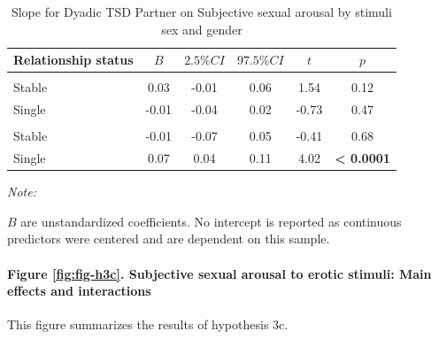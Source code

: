 \documentclass[
  bookmarksnumbered]{article}
\begin{document}
\begin{table}[H]
\centering
\caption{\label{tab:unnamed-chunk-32}Slope for Dyadic TSD Partner on Subjective sexual arousal
               by stimuli sex and gender}
\centering
\begin{threeparttable}
\begin{tabular}[t]{lccccc}
\toprule
Relationship status & $B$ & $2.5\% CI$ & $97.5\% CI$ & $t$ & $p$\\
\midrule
\addlinespace[0.3em]
\multicolumn{6}{l}{\cellcolor{lightgray}{Gender: Women}}\\
\hspace{1em}Stable & 0.03 & -0.01 & 0.06 & 1.54 & 0.12\\
\hspace{1em}Single & -0.01 & -0.04 & 0.02 & -0.73 & 0.47\\
\addlinespace[0.3em]
\multicolumn{6}{l}{\cellcolor{lightgray}{Gender: Men}}\\
\hspace{1em}Stable & -0.01 & -0.07 & 0.05 & -0.41 & 0.68\\
\hspace{1em}Single & 0.07 & 0.04 & 0.11 & 4.02 & \textbf{< 0.0001}\\
\bottomrule
\end{tabular}
\begin{tablenotes}[para]
\item \textit{Note: } 
\item $B$ are unstandardized coefficients. No intercept is reported
               as continuous predictors were centered and are dependent on this sample.
\end{tablenotes}
\end{threeparttable}
\end{table}

\paragraph{Figure \ref{fig:fig-h3c}. Subjective sexual arousal to erotic stimuli: Main effects and interactions}\label{figure-reffigfig-h3c.-subjective-sexual-arousal-to-erotic-stimuli-main-effects-and-interactions}

This figure summarizes the results of hypothesis 3c.
\end{document}

